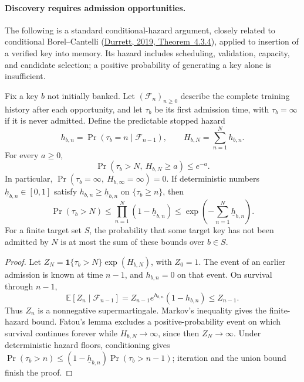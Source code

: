 
\paragraph{Discovery requires admission opportunities.}
The following is a standard conditional-hazard argument, closely related to
conditional Borel--Cantelli
(\href{https://sites.math.duke.edu/~rtd/PTE/PTE5_011119.pdf}{Durrett, 2019,
Theorem~4.3.4}), applied to insertion of a verified key into memory.
Its hazard includes scheduling, validation, capacity, and candidate selection;
a positive probability of generating a key alone is insufficient.

\begin{proposition}
Fix a key $b$ not initially banked. Let $(\mathcal F_n)_{n\ge0}$ describe the
complete training history after each opportunity, and let $\tau_b$ be its first
admission time, with $\tau_b=\infty$ if it is never admitted. Define the
predictable stopped hazard
\[
 h_{b,n}=\Pr(\tau_b=n\mid\mathcal F_{n-1}),\qquad
 H_{b,N}=\sum_{n=1}^N h_{b,n}.
\]
For every $a\ge0$,
\[
 \Pr(\tau_b>N,\ H_{b,N}\ge a)\le e^{-a}.
\]
In particular,
$\Pr(\tau_b=\infty,\ H_{b,\infty}=\infty)=0$.
If deterministic numbers $\underline h_{b,n}\in[0,1]$ satisfy
$h_{b,n}\ge\underline h_{b,n}$ on $\{\tau_b\ge n\}$, then
\[
 \Pr(\tau_b>N)\le\prod_{n=1}^N(1-\underline h_{b,n})
 \le\exp\!\left(-\sum_{n=1}^N\underline h_{b,n}\right).
\]
For a finite target set $S$, the probability that some target key has not been
admitted by $N$ is at most the sum of these bounds over $b\in S$.
\end{proposition}
\begin{proof}
Let $Z_N=\mathbf1\{\tau_b>N\}\exp(H_{b,N})$, with $Z_0=1$.
The event of an earlier admission is known at time $n-1$, and $h_{b,n}=0$
on that event. On survival through $n-1$,
\[
 \mathbb E[Z_n\mid\mathcal F_{n-1}]
 =Z_{n-1}e^{h_{b,n}}(1-h_{b,n})\le Z_{n-1}.
\]
Thus $Z_n$ is a nonnegative supermartingale. Markov's inequality gives the
finite-hazard bound. Fatou's lemma excludes a positive-probability event on
which survival continues forever while $H_{b,N}\to\infty$, since then
$Z_N\to\infty$. Under deterministic hazard floors, conditioning gives
$\Pr(\tau_b>n)\le(1-\underline h_{b,n})\Pr(\tau_b>n-1)$;
iteration and the union bound finish the proof.
\end{proof}

